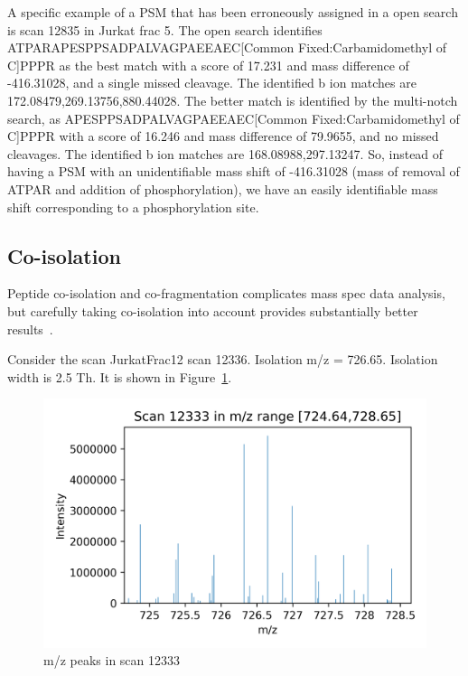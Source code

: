 \documentclass[journal=jprobs,manuscript=article]{achemso}
\begin{document}
A specific example of a PSM that has been erroneously assigned in a open search is scan 12835 in Jurkat frac 5.
The open search identifies ATPARAPESPPSADPALVAGPAEEAEC[Common Fixed:Carbamidomethyl of C]PPPR as the best match with a score of 17.231 and mass difference of -416.31028, and a single missed cleavage.
The identified b ion matches are 172.08479,269.13756,880.44028.
The better match is identified by the multi-notch search, as APESPPSADPALVAGPAEEAEC[Common Fixed:Carbamidomethyl of C]PPPR with a score of 16.246 and mass difference of 79.9655, and no missed cleavages.
The identified b ion matches are 168.08988,297.13247.
So, instead of having a PSM with an unidentifiable mass shift of -416.31028 (mass of removal of ATPAR and addition of phosphorylation), we have an easily identifiable mass shift corresponding to a phosphorylation site.

\subsection{Co-isolation}

Peptide co-isolation and co-fragmentation complicates mass spec data analysis, but carefully taking co-isolation into account provides substantially better results~\cite{Zhang2014}.

Consider the scan JurkatFrac12 scan 12336. Isolation m/z  = 726.65.
Isolation width is 2.5 Th.
It is shown in Figure~\ref{fig:fig5-coIsolationSpectrum}.


\begin{figure}[H]
\includegraphics{fig5-coIsolationSpectrum.png}
\caption{m/z peaks in scan 12333}
\label{fig:fig5-coIsolationSpectrum}
\end{figure}
\end{document}
